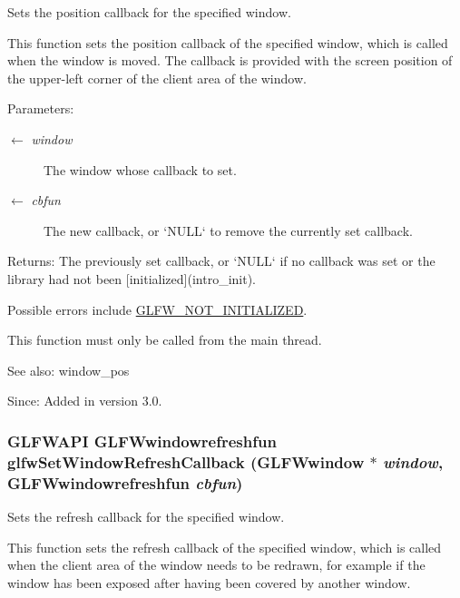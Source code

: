 Sets the position callback for the specified window. 

This function sets the position callback of the specified window, which is called when the window is moved. The callback is provided with the screen position of the upper-left corner of the client area of the window.

\begin{Desc}
\item[Parameters:]
\begin{description}
\item[\mbox{$\leftarrow$} {\em window}]The window whose callback to set. \item[\mbox{$\leftarrow$} {\em cbfun}]The new callback, or `NULL` to remove the currently set callback. \end{description}
\end{Desc}
\begin{Desc}
\item[Returns:]The previously set callback, or `NULL` if no callback was set or the library had not been \mbox{[}initialized\mbox{]}(intro\_\-init).\end{Desc}
Possible errors include \hyperlink{group__errors_g2374ee02c177f12e1fa76ff3ed15e14a}{GLFW\_\-NOT\_\-INITIALIZED}.

This function must only be called from the main thread.

\begin{Desc}
\item[See also:]window\_\-pos\end{Desc}
\begin{Desc}
\item[Since:]Added in version 3.0. \end{Desc}
\hypertarget{group__window_g9d2621fbc271a0cdc0ce91f9749f46e3}{
\subsubsection[glfwSetWindowRefreshCallback]{\setlength{\rightskip}{0pt plus 5cm}GLFWAPI {\bf GLFWwindowrefreshfun} glfwSetWindowRefreshCallback ({\bf GLFWwindow} $\ast$ {\em window}, \/  {\bf GLFWwindowrefreshfun} {\em cbfun})}}
\label{group__window_g9d2621fbc271a0cdc0ce91f9749f46e3}


Sets the refresh callback for the specified window. 

This function sets the refresh callback of the specified window, which is called when the client area of the window needs to be redrawn, for example if the window has been exposed after having been covered by another window.

